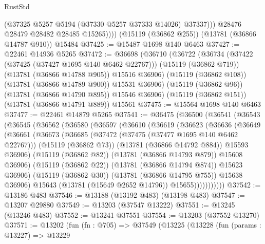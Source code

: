 \begin{lexlean}{RustStd}
\begin{coremodule}
                (@37325 @5257 @5194 (@37330 @5257 @37333 @14026) @37337)))
            @28476
            @28479
            @28482
            @28485
            @15265))))
    (@15119 (@36862 @255))
    (@13781 (@36866 @14787 @910))
    @15484
@37425 := @15487 @1698 @140 @6463
@37427 := @22461 @14936 @5265
@37472 := @36698
    (@36710
      (@36722
        (@36734
          (@37422 (@37425 (@37427 @1695 @140 @6462 @22767)))
          (@15119 (@36862 @719))
          (@13781 (@36866 @14788 @905))
          @15516
          @36906)
        (@15119 (@36862 @108))
        (@13781 (@36866 @14789 @900))
        @15531
        @36906)
      (@15119 (@36862 @96))
      (@13781 (@36866 @14790 @895))
      @15546
      @36906)
    (@15119 (@36862 @151))
    (@13781 (@36866 @14791 @889))
    @15561
@37475 := @15564 @1698 @140 @6463
@37477 := @22461 @14879 @5265
@37541 := @36475
    (@36500
      (@36541
        (@36543
          (@36545
            (@36562
              (@36580
                (@36597
                  (@36610
                    (@36619
                      (@36623
                        (@36636
                          (@36649
                            (@36661
                              (@36673
                                (@36685
                                  (@37472 (@37475 (@37477 @1695 @140 @6462 @22767)))
                                  (@15119 (@36862 @73))
                                  (@13781 (@36866 @14792 @884))
                                  @15593
                                  @36906)
                                (@15119 (@36862 @82))
                                (@13781 (@36866 @14793 @879))
                                @15608
                                @36906)
                              (@15119 (@36862 @22))
                              (@13781 (@36866 @14794 @874))
                              @15623
                              @36906)
                            (@15119 (@36862 @30))
                            (@13781 (@36866 @14795 @755))
                            @15638
                            @36906)
                          @15643
                          (@13781 (@15649 @2652 @14796))
                          @15655)))))))))))
@37542 := @13186 @483
@37546 := @13188 (@13192 @483) (@13198 @483)
@37547 := @13207 @29880
@37549 := @13203 (@37547 @13222)
@37551 := @13245 (@13246 @483)
@37552 := @13241 @37551
@37554 := @13203 (@37552 @13270)
@37571 := @13202
    (fun (fn : @705) =>
    @37549
      (@13225
        (@13228
          (fun (params : @13227) =>
          @13229

\end{coremodule}
\end{lexlean}
